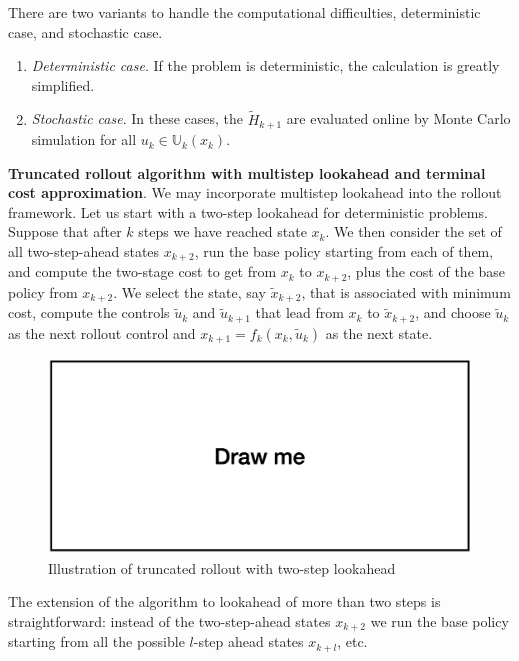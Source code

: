 \documentclass[
]{book}
\theoremstyle{definition}
\theoremstyle{definition}
\theoremstyle{definition}
\theoremstyle{definition}
\theoremstyle{remark}
\begin{document}
There are two variants to handle the computational difficulties, deterministic case, and stochastic case.

\begin{enumerate}
\def\labelenumi{\arabic{enumi}.}
\item
  \emph{Deterministic case}. If the problem is deterministic, the calculation is greatly simplified.
\item
  \emph{Stochastic case}. In these cases, the \(\tilde H_{k+1}\) are evaluated online by Monte Carlo simulation for all \(u_k \in \mathbb U_k(x_k)\).
\end{enumerate}

\textbf{Truncated rollout algorithm with multistep lookahead and terminal cost approximation}. We may incorporate multistep lookahead into the rollout framework. Let us start with a two-step lookahead for deterministic problems. Suppose that after \(k\) steps we have reached state \(x_k\). We then consider the set of all two-step-ahead states \(x_{k+2}\), run the base policy starting from each of them, and compute the two-stage cost to get from \(x_k\) to \(x_{k+2}\), plus the cost of the base policy from \(x_{k+2}\). We select the state, say \(\tilde x_{k+2}\), that is associated with minimum cost, compute the controls \(\tilde u_k\) and \(\tilde u_{k+1}\) that lead from \(x_k\) to \(\tilde x_{k+2}\), and choose \(\tilde u_k\) as the next rollout control and \(x_{k+1}=f_k(x_k,\tilde u_k)\) as the next state.

\begin{figure}

{\centering \includegraphics[width=0.6\linewidth]{images/drawme} 

}

\caption{Illustration of truncated rollout with two-step lookahead}\label{fig:multi-step-rollout}
\end{figure}

The extension of the algorithm to lookahead of more than two steps is straightforward: instead of the two-step-ahead states \(x_{k+2}\) we run the base policy starting from all the possible \(l\)-step ahead states \(x_{k+l}\), etc.
\end{document}
